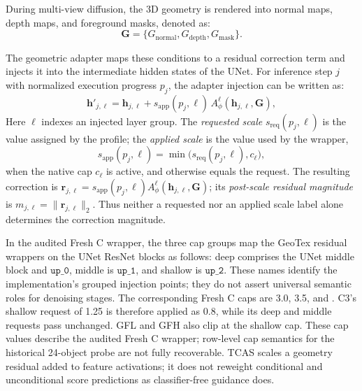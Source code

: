 \documentclass[times,twocolumn,final]{elsarticle}
\providecommand{\DIFadd}[1]{{\protect\color{blue} \sf #1}} %
\providecommand{\DIFaddbegin}{} %
\providecommand{\DIFaddend}{} %
\begin{document}
During multi-view diffusion, the 3D geometry is rendered into normal maps, depth maps, and foreground masks, denoted as:
\begin{equation}
\mathbf{G} = \{G_\text{normal}, G_\text{depth}, G_\text{mask}\}.
\end{equation}

The geometric adapter maps these conditions to a residual correction term and injects it into the intermediate hidden states of the UNet. For   \DIFaddbegin \DIFadd{inference step $j$ with normalized execution progress $p_j$}\DIFaddend , the adapter injection can be written as:
  \DIFaddbegin \begin{equation}
\mathbf{h}'_{j,\ell} = \mathbf{h}_{j,\ell} + s_{\mathrm{app}}(p_j,\ell)\, A^\ell_\phi(\mathbf{h}_{j,\ell}, \mathbf{G}),
\label{eq:injection}
\end{equation}\DIFaddend 
  \DIFaddbegin \DIFadd{Here $\ell$ indexes an injected layer group. The \emph{requested scale} $s_{\mathrm{req}}(p_j,\ell)$ is the value assigned by the profile; the \emph{applied scale} is the value used by the wrapper,
}\begin{equation}
s_{\mathrm{app}}(p_j,\ell)=\min\!\bigl(s_{\mathrm{req}}(p_j,\ell),c_\ell\bigr),
\end{equation}
\DIFadd{when the native cap $c_\ell$ is active, and otherwise equals the request. The resulting correction is $\mathbf{r}_{j,\ell}=s_{\mathrm{app}}(p_j,\ell)A^\ell_\phi(\mathbf{h}_{j,\ell},\mathbf{G})$; its \emph{post-scale residual magnitude} is $m_{j,\ell}=\|\mathbf{r}_{j,\ell}\|_2$. Thus neither a requested nor an applied scale label alone determines the correction magnitude.
}

\DIFadd{In the audited Fresh C wrapper, the three cap groups map the GeoTex residual wrappers on the UNet ResNet blocks as follows: deep comprises the UNet middle block and $\texttt{up\_0}$, middle is $\texttt{up\_1}$, and shallow is $\texttt{up\_2}$. These names identify the implementation's grouped injection points; they do not assert universal semantic roles for denoising stages. The corresponding Fresh C caps are 3.0, 3.5, }\DIFaddend and   \DIFaddbegin \DIFadd{0.8. C3's shallow request of 1.25 is therefore applied as 0.8, while its deep and middle requests pass unchanged. GFL and GFH also clip at the shallow cap. These cap values describe the audited Fresh C wrapper; row-level cap semantics for the historical 24-object probe are not fully recoverable. TCAS scales a geometry residual added to feature activations; it does not reweight conditional and unconditional score predictions as classifier-free guidance does}\DIFaddend .
\end{document}
